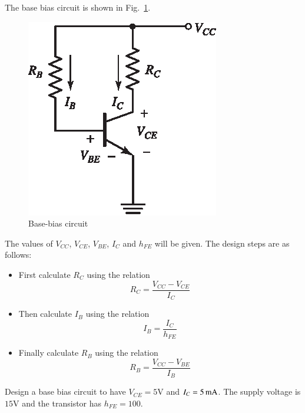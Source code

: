 The base bias circuit is shown in Fig.~\ref{fig4.10}.
\begin{figure}[H]
\centering
\includegraphics[scale=1.25]{chap3/S3-EE-03-042.eps}
\caption{Base-bias circuit}\label{fig4.10}
\end{figure}

The values of $V_{CC}$, $V_{CE}$, $V_{BE}$, $I_{C}$ and $h_{FE}$ will be given. The design steps are as follows:
\begin{itemize}
\item First calculate $R_{C}$ using the relation
\begin{equation}
R_{C}=\frac{V_{CC}-V_{CE}}{I_{C}}\label{eq4.15}
\end{equation}

\item Then calculate $I_{B}$ using the relation
\begin{equation}
I_{B}=\frac{I_{C}}{h_{FE}}\label{eq4.16}
\end{equation}

\item Finally calculate $R_{B}$ using the relation
\begin{equation}
R_{B}=\frac{V_{CC}-V_{BE}}{I_{B}}\label{eq4.17}
\end{equation}
\end{itemize}

\eject

\begin{example}\label{exam4.11}
Design a base bias circuit to have $V_{CE}=5\text{V}$ and $I_{C}=5\text{\,mA}$. The supply voltage is $15\text{V}$ and the transistor has $h_{FE}=100$.
\end{example}

